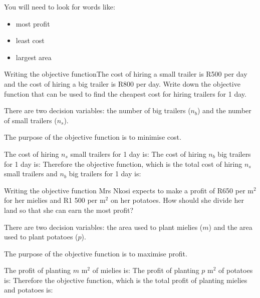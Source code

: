 You will need to look for words like:
\begin{itemize}
\item{most profit}
\item{least cost}
\item{largest area}
\end{itemize}

\begin{wex}
{Writing the objective function}{The cost of hiring a small trailer is R500 per day and the cost of hiring a big trailer is R800 per day. Write down the objective function that can be used to find the cheapest cost for hiring trailers for 1 day.}
{
There are two decision variables: the number of big trailers ($n_b$) and the number of small trailers ($n_s$).

The purpose of the objective function is to minimise cost.

The cost of hiring $n_s$ small trailers for 1 day is:
The cost of hiring $n_b$ big trailers for 1 day is:
Therefore the objective function, which is the total cost of hiring $n_s$ small trailers and $n_b$ big trailers for 1 day is:
}
\end{wex}

\begin{wex}
{Writing the objective function}{
Mrs Nkosi expects to make a profit of R650 per m$^2$ for her mielies and R1 500 per m$^2$ on her potatoes. How should she divide her land so that she can earn the most profit?}
{
There are two decision variables: the area used to plant mielies ($m$) and the area used to plant potatoes ($p$).

The purpose of the objective function is to maximise profit.

The profit of planting $m$ m$^2$ of mielies is:
The profit of planting $p$ m$^2$ of potatoes is:
Therefore the objective function, which is the total profit of planting mielies and potatoes is:
}
\end{wex}


